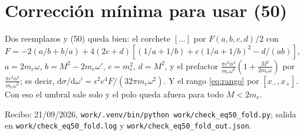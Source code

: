 \documentclass[11pt,a4paper]{article}
\newcommand{\eps}{\epsilon}
\newcommand{\dd}{\mathrm{d}}
\begin{document}
\section{Corrección mínima para usar (50)}
Dos reemplazos y (50) queda bien: el corchete $[\ldots]$ por $F(a,b,c,d)/2$ con
$F=-2(a/b+b/a)+4(2c+d)[(1/a+1/b)+c(1/a+1/b)^2-d/(ab)]$, $a=2m_e\omega$, $b=M^2-2m_e\omega'$, $c=m_e^2$, $d=M^2$, y
el prefactor $\frac{\pi\eps^2\alpha^2}{m_e\omega^2}(1+\frac{M^2}{2m_e\omega})$ por $\frac{\pi\eps^2\alpha^2}{m_e\omega^2}$;
es decir, $\dd\sigma/\dd\omega'=\eps^2e^4F/(32\pi m_e\omega^2)$. Y el rango \eqref{eq:rango} por $[x_-,x_+]$. Con eso el
umbral sale solo y el polo queda afuera para todo $M<2m_e$.

\medskip\noindent\small\sloppy Recibo: 21/09/2026, \texttt{work/.venv/bin/python work/check\_eq50\_fold.py}; salida en
\texttt{work/check\_eq50\_fold.log} y \texttt{work/check\_eq50\_fold\_out.json}.
\end{document}
